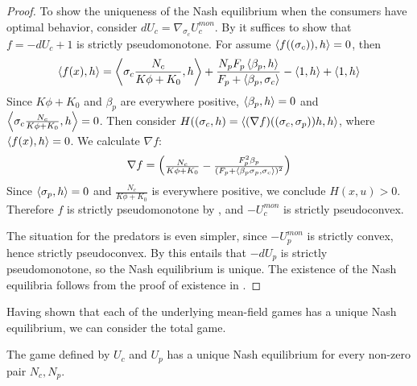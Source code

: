\begin{proof}
  To show the uniqueness of the Nash equilibrium when the consumers have optimal behavior, consider $dU_c = \nabla_{\sigma_c} U_c^{mon}$.  By  it suffices to show that $f = -dU_c + 1$ is strictly pseudomonotone.
  For  assume $\left \langle f((\sigma_c)),h \right \rangle = 0$, then
  \begin{equation}
    \begin{split}
      \ip{f(x)}{h} = \ip{\sigma_c \frac{N_c}{K\phi + K_0} }{h} + \frac{N_p F_p \ip{\beta_p }{h}}{F_p + \ip{\beta_p}{\sigma_c}} - \ip{1}{h} + \ip{1}{h}
    \end{split}
  \end{equation}
  Since $K\phi + K_0$ and $\beta_p$ are everywhere positive, $\left \langle \beta_p,h \right \rangle = 0$ and $\ip{\sigma_c \frac{N_c}{K\phi + K_0}}{h} = 0$. Then consider $H((\sigma_c,h)= \left \langle (\nabla f)((\sigma_c,\sigma_p))h,h \right \rangle$, where $\left \langle f(x),h \right \rangle = 0$. We calculate $\nabla f$:
    \begin{equation}
      \nabla f = \begin{pmatrix} \frac{N_c}{K \phi + K_0} - \frac{F_p^2\beta_p}{(F_p + \ip{\beta_p \sigma_p}{\sigma_c})^2} \\
    \end{pmatrix}
    \end{equation}
    Since $\left \langle \sigma_p,h \right \rangle=0$ and $\frac{N_c}{K\phi + K_0}$ is everywhere positive, we conclude $H(x,u)>0$. Therefore $f$ is strictly pseudomonotone by , and $-U_c^{mon}$ is strictly pseudoconvex.

    The situation for the predators is even simpler, since $-U_p^{mon}$ is strictly convex, hence strictly pseudoconvex. By  this entails that $-dU_p$ is strictly pseudomonotone, so the Nash equilibrium is unique.
    The existence of the Nash equilibria follows from the proof of existence in .
\end{proof}
Having shown that each of the underlying mean-field games has a unique Nash equilibrium, we can consider the total game.
\begin{proposition}
  \label{prop:exist_unique_nash}
  The game defined by $U_c$ and $U_p$ has a unique Nash equilibrium for every non-zero pair $N_c,N_p$.
\end{proposition}
